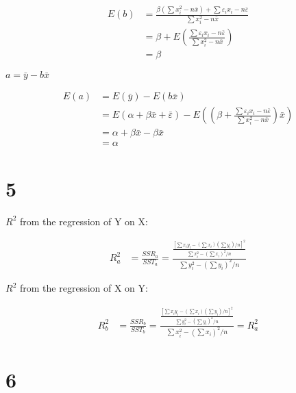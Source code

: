 \documentclass{article}
\begin{document}
\begin{equation*}
	\begin{split}
		E(b)&=\frac{\beta(\sum x_i^2-n\bar{x})+\sum \varepsilon_i x_i-n\bar{\varepsilon}}{\sum x_i^2-n\bar{x}}\\
		&=\beta+E(\frac{\sum \varepsilon_i x_i-n\bar{\varepsilon}}{\sum x_i^2-n\bar{x}})\\
		&=\beta
	\end{split}
\end{equation*}

$a=\bar{y}-b\bar{x}$

\begin{equation*}
	\begin{split}
		E(a)&=E(\bar{y})-E(b\bar{x})\\
		&=E(\alpha+\beta\bar{x}+\bar{\varepsilon})-E((\beta+\frac{\sum \varepsilon_i x_i-n\bar{\varepsilon}}{\sum x_i^2-n\bar{x}})\bar{x})\\
		&=\alpha+\beta\bar{x}-\beta\bar{x}\\
		&=\alpha
	\end{split}
\end{equation*}

\newpage

\section*{5}\noindent

$R^2$ from the regression of Y on X:

\begin{equation*}
	\begin{split}
		R^2_a&=\frac{SSR_a}{SST_a}=\frac{\frac{[\sum x_iy_i-(\sum x_i)(\sum y_i)/n]^2}{\sum x_i^2-(\sum x_i)^2/n}}{\sum y_i^2-(\sum y_i)^2/n}
	\end{split}
\end{equation*}

$R^2$ from the regression of X on Y:

\begin{equation*}
	\begin{split}
		R^2_b&=\frac{SSR_b}{SST_b}=\frac{\frac{[\sum x_iy_i-(\sum x_i)(\sum y_i)/n]^2}{\sum y_i^2-(\sum y_i)^2/n}}{\sum x_i^2-(\sum x_i)^2/n}=R^2_a
	\end{split}
\end{equation*}

\section*{6}
\end{document}
